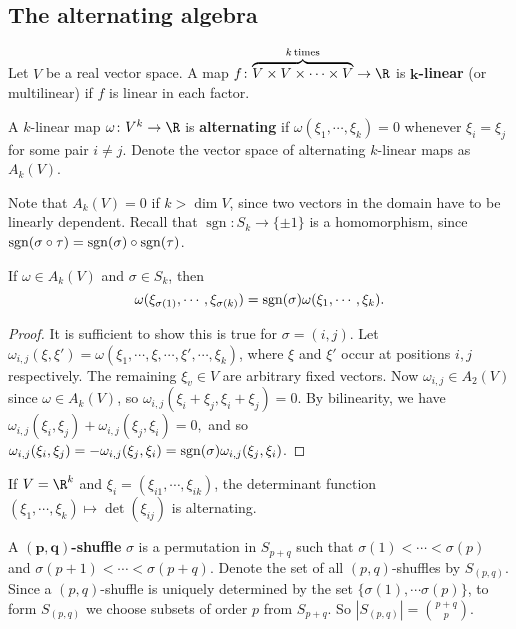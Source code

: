 \subsection{The alternating algebra}
Let $V$ be a real vector space. A map $
f \colon \overset{k \, \text{times} }{\overbrace{V\times V\times \cdots \times V} }  \to \R$ is $\mathbf k$\textbf{-linear} (or multilinear) if $f$ is linear in each factor.
\begin{definition}[]
    A $k$-linear map $\omega \colon V^k \to \R$ is \textbf{alternating} if $\omega(\xi_1,\cdots ,\xi_k)=0$ whenever $\xi_i =\xi_j $ for some pair $i\neq j$. Denote the vector space of alternating $k$-linear maps as $A_k(V)$.
\end{definition}
Note that $A_k(V)=0$ if $k>\dim V$, since two vectors in the domain have to be linearly dependent. Recall that $\operatorname{sgn} \colon S_k \to \{\pm 1\} $ is a homomorphism, since $\operatorname{sgn}(\sigma \circ \tau)=\operatorname{sgn}(\sigma) \circ \operatorname{sgn}(\tau)$.
\begin{lemma}\label{alt} 
    If $\omega \in A_k(V)$ and $\sigma \in S_k$, then \[
        \omega(\xi _{\sigma(1)},\cdots ,\xi_{\sigma(k)})=\operatorname{sgn}(\sigma)\omega(\xi_1,\cdots ,\xi_k).
    \] 
\end{lemma}
\begin{proof}
    It is sufficient to show this is true for $\sigma=(i,j)$. Let $\omega_{i,j}(\xi,\xi')=\omega(\xi_1,\cdots ,\xi,\cdots ,\xi',\cdots ,\xi_k)$, where $\xi$ and $\xi'$ occur at positions $i,j$ respectively. The remaining $\xi_v \in V$ are arbitrary fixed vectors. Now $\omega _{i,j}\in A_2(V)$ since $\omega \in A_k(V)$, so $\omega _{i,j}(\xi_i +\xi_j ,\xi_i +\xi_j )=0$. By bilinearity, we have $\omega_{i,j}(\xi_i ,\xi_j )+\omega_{i,j}(\xi_j ,\xi_i )=0,$ and so $\omega _{i,j}(\xi_i ,\xi_j )=-\omega _{i,j}(\xi_j ,\xi_i )=\operatorname{sgn}(\sigma)\omega _{i,j}(\xi_j ,\xi_i )$.
\end{proof}
\begin{example}
    If $V=\R^k$ and $\xi_i =(\xi_{i1},\cdots ,\xi_{ik})$, the determinant function $(\xi_1,\cdots ,\xi_k) \mapsto \det(\xi_{ij})$ is alternating.
\end{example}
\begin{definition}[]
    A $\mathbf { (p,q)}$\textbf{-shuffle} $\sigma$ is a permutation in $S_{p+q}$ such that $\sigma(1)< \cdots < \sigma(p)$ and $\sigma(p+1)< \cdots  < \sigma(p+q)$. Denote the set of all $(p,q)$-shuffles by $S_{(p,q)}$. Since a $(p,q)$-shuffle is uniquely determined by the set $\{\sigma(1),\cdots \sigma(p)\} $, to form $S_{(p,q)}$ we choose subsets of order $p$ from  $S_{p+q}$. So $|S_{(p,q)}|={p+q\choose p} $.
\end{definition}

